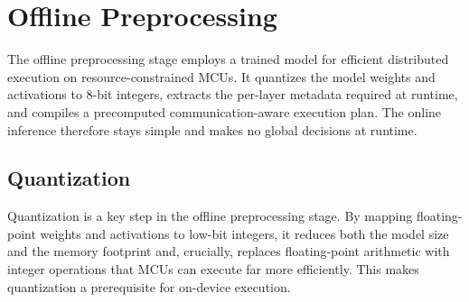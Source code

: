     

\section{Offline Preprocessing}
\label{sec:offline-preprocessing}

The offline preprocessing stage employs a trained model for efficient distributed execution on resource-constrained MCUs. It quantizes the model weights and activations to 8-bit integers, extracts the per-layer metadata required at runtime, and compiles a precomputed communication-aware execution plan. The online inference therefore stays simple and makes no global decisions at runtime.


\subsection{Quantization}
Quantization is a key step in the offline preprocessing stage. By mapping floating-point weights and activations to low-bit integers, it reduces both the model size and the memory footprint and, crucially, replaces floating-point arithmetic with integer operations that MCUs can execute far more efficiently.
This makes quantization a prerequisite for on-device execution.

